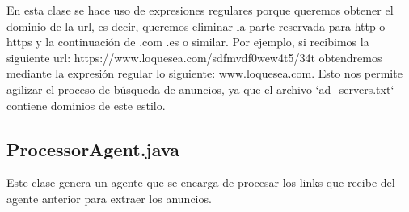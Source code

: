 \documentclass{pre-tfg}
\begin{document}
En esta clase se hace uso de expresiones regulares porque queremos obtener el dominio de la url, es decir, queremos eliminar
la parte reservada para http o https y la continuación de .com .es o similar. Por ejemplo, si recibimos la siguiente url:
https://www.loquesea.com/sdfmvdf0wew4t5/34t obtendremos mediante la expresión regular lo siguiente:
www.loquesea.com. Esto nos permite agilizar el proceso de búsqueda de anuncios, ya que el archivo `ad\_servers.txt`
contiene dominios de este estilo.

\subsection{ProcessorAgent.java}

Este clase genera un agente que se encarga de procesar los links que recibe del agente anterior para extraer los anuncios.
\end{document}

